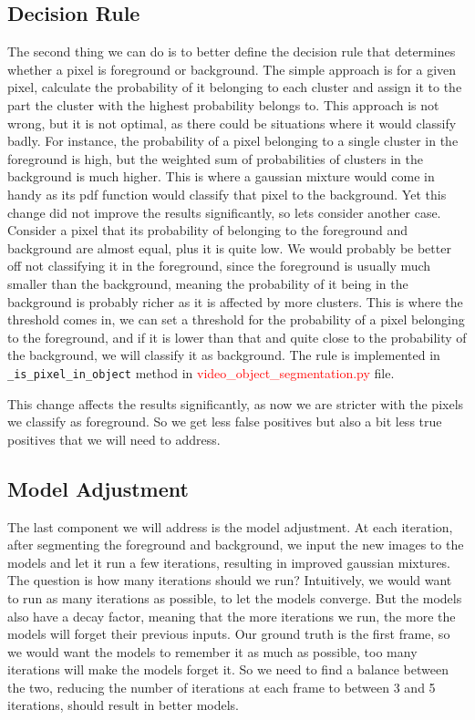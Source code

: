 \subsection{Decision Rule}\label{subsec:decision}
The second thing we can do is to better define the decision rule that determines whether a pixel is foreground or background.
The simple approach is for a given pixel, calculate the probability of it belonging to each cluster and assign it to the part the cluster with the highest probability belongs to.
This approach is not wrong, but it is not optimal, as there could be situations where it would classify badly.
For instance, the probability of a pixel belonging to a single cluster in the foreground is high, but the weighted sum of probabilities of clusters in the background is much higher.
This is where a gaussian mixture would come in handy as its pdf function would classify that pixel to the background.
Yet this change did not improve the results significantly, so lets consider another case.
Consider a pixel that its probability of belonging to the foreground and background are almost equal, plus it is quite low.
We would probably be better off not classifying it in the foreground, since the foreground is usually much smaller than the background,
meaning the probability of it being in the background is probably richer as it is affected by more clusters.
This is where the threshold comes in, we can set a threshold for the probability of a pixel belonging to the foreground,
and if it is lower than that and quite close to the probability of the background, we will classify it as background.
The rule is implemented in \texttt{\_is\_pixel\_in\_object} method in \textcolor{red}{video\_object\_segmentation.py} file.

This change affects the results significantly, as now we are stricter with the pixels we classify as foreground.
So we get less false positives but also a bit less true positives that we will need to address.

\subsection{Model Adjustment}\label{subsec:model}
The last component we will address is the model adjustment.
At each iteration, after segmenting the foreground and background, we input the new images to the models and let it run a few iterations, resulting in improved gaussian mixtures.
The question is how many iterations should we run?
Intuitively, we would want to run as many iterations as possible, to let the models converge.
But the models also have a decay factor, meaning that the more iterations we run, the more the models will forget their previous inputs.
Our ground truth is the first frame, so we would want the models to remember it as much as possible, too many iterations will make the models forget it.
So we need to find a balance between the two, reducing the number of iterations at each frame to between 3 and 5 iterations, should result in better models.